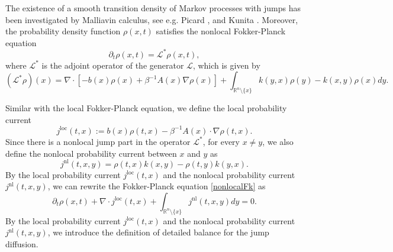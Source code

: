 \documentclass[10pt]{article}
\theoremstyle{definition}
\numberwithin{equation}{section}
\begin{document}
The existence of a smooth transition density of Markov processes with jumps has been investigated by Malliavin calculus, see e.g. Picard \cite{P96}, and Kunita \cite[Chapter 6]{K19}.
Moreover, the probability density function $\rho(x,t)$ satisfies the nonlocal Fokker-Planck equation
\begin{equation}\label{nonlocalFk}
    \partial_t \rho(x,t) = \mathcal{L}^{\ast}\rho(x,t),
\end{equation}
where $\mathcal{L}^{\ast}$ is the adjoint operator of the generator $\mathcal{L}$, which is given by
\begin{equation*}
    (\mathcal{L}^{\ast}\rho)(x) = \nabla\cdot [-b(x)\rho(x) + \beta^{-1} A(x)\nabla \rho(x)] +\int_{\mathbb{R}^n \setminus \{ x \} }k(y,x)\rho(y) - k(x,y)\rho(x)dy.
\end{equation*}



Similar with the local Fokker-Planck equation, we define the local probability current
\begin{equation}
    j^\mathrm{loc}(t,x) := b(x)\rho(t,x) - \beta^{-1} A(x)\cdot\nabla \rho(t,x).
\end{equation}
Since there is a nonlocal jump part in the operator $\mathcal{L}^{\ast}$, for every $x \neq y$, we also define the nonlocal probability current between $x$ and $y$ as
\begin{equation}
    j^\mathrm{nl}(t,x,y) = \rho(t,x)k(x,y) - \rho(t,y)k(y,x).
\end{equation}
By the local probability current $j^\mathrm{loc}(t,x)$ and the nonlocal probability current $j^\mathrm{nl}(t,x,y)$, we can rewrite the Fokker-Planck equation \eqref{nonlocalFk} as
\begin{equation*}
    \partial_t \rho(x,t) + \nabla\cdot j^\mathrm{loc}(t,x) + \int_{\mathbb{R}^n \setminus \{x\}} j^\mathrm{nl}(t,x,y) dy=0.
\end{equation*}
By the local probability current $j^\mathrm{loc}(t,x)$ and the nonlocal probability current $j^\mathrm{nl}(t,x,y)$, we introduce the definition of detailed balance for the jump diffusion.
\end{document}
